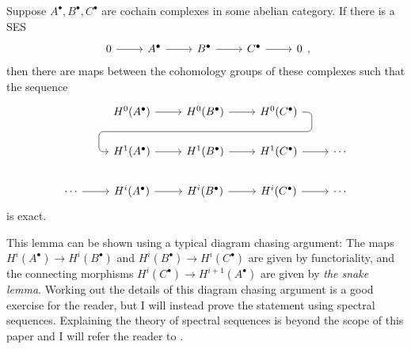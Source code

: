 \begin{lemm}
  Suppose $A^{\bullet},B^{\bullet},C^{\bullet}$ are cochain complexes in some
  abelian category. If there is a SES
  \[\begin{tikzcd}
      0\rar & A^{\bullet}\rar & B^{\bullet}\rar & C^{\bullet}\rar & 0
    \end{tikzcd},\]
  then there are maps between the cohomology groups of these complexes
  such that the sequence
  \[\begin{tikzcd}
    & H^{0}(A^{\bullet}) \rar & H^{0}(B^{\bullet})
    \rar\dar[phantom, ""{coordinate, name=Z}] & H^{0}(C^{\bullet})
    \arrow[rounded corners, to path={ -- ([xshift=2ex]\tikztostart.east)
      |- (Z) -| ([xshift=-2ex]\tikztotarget.west) -- (\tikztotarget)},
    overlay]{dll} & \\
    & H^{1}(A^{\bullet}) \rar & H^{1}(B^{\bullet})\rar
    & H^{1}(C^{\bullet}) \rar & \cdots \\
    \cdots \rar& H^{i}(A^{\bullet}) \rar & H^{i}(B^{\bullet})\rar
    & H^{i}(C^{\bullet}) \rar & \cdots
    \end{tikzcd}\]
  is exact.
\end{lemm}
This lemma can be shown using a typical diagram chasing argument: The maps
$H^{i}(A^{\bullet})\to H^{i}(B^{\bullet})$ and
$H^{i}(B^{\bullet})\to H^{i}(C^{\bullet})$ are given by functoriality, and the
connecting morphisms $H^{i}(C^{\bullet})\to H^{i+1}(A^{\bullet})$ are given by
\emph{the snake lemma}. Working out the details of this diagram chasing argument is
a good exercise for the reader, but I will instead prove the statement using
spectral sequences. Explaining the theory of spectral sequences is beyond
the scope of this paper and I will refer the reader to
\cite[section 1.7]{vakil}.
